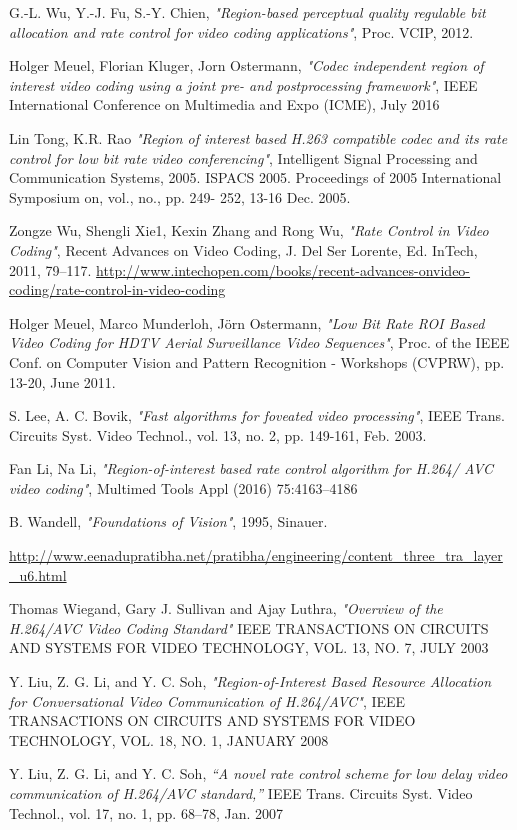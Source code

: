 \documentclass[11pt]{article} %
\begin{document}
\begin{thebibliography}{9}
G.-L. Wu, Y.-J. Fu, S.-Y. Chien, \textit{"Region-based perceptual quality regulable bit allocation and rate control for video coding applications"},
Proc. VCIP, 2012.

Holger Meuel, Florian Kluger, Jorn Ostermann, \textit{"Codec independent region of interest video coding using a joint pre- and postprocessing framework"}, 
IEEE International Conference on Multimedia and Expo (ICME), July 2016

Lin Tong, K.R. Rao \textit{"Region of interest based H.263 compatible codec and its rate control for low bit rate video conferencing"}, 
Intelligent Signal Processing and Communication Systems, 2005. ISPACS 2005. Proceedings of 2005 International Symposium on, vol., no., pp. 249- 252, 13-16 Dec. 2005.

Zongze Wu, Shengli Xie1, Kexin Zhang and Rong Wu, \textit{"Rate Control in Video Coding"},
Recent Advances on Video Coding, J. Del Ser Lorente, Ed. InTech,
2011, 79–117. \url{http://www.intechopen.com/books/recent-advances-onvideo-coding/rate-control-in-video-coding}

Holger Meuel, Marco Munderloh, Jörn Ostermann, \textit{"Low Bit Rate ROI Based Video Coding for HDTV Aerial Surveillance Video Sequences"}, 
Proc. of the IEEE Conf. on Computer Vision and Pattern Recognition - Workshops (CVPRW), pp. 13-20, June 2011.

S. Lee, A. C. Bovik, \textit{"Fast algorithms for foveated video processing"},
IEEE Trans. Circuits Syst. Video Technol., vol. 13, no. 2, pp. 149-161, Feb. 2003.

Fan Li, Na Li, \textit{"Region-of-interest based rate control algorithm for H.264/
AVC video coding"},
Multimed Tools Appl (2016) 75:4163–4186
 
B. Wandell, \textit{"Foundations of Vision"}, 1995, Sinauer.

\url{http://www.eenadupratibha.net/pratibha/engineering/content_three_tra_layer_u6.html}

Thomas Wiegand, Gary J. Sullivan and Ajay Luthra, \textit{"Overview of the H.264/AVC Video Coding Standard"}
IEEE TRANSACTIONS ON CIRCUITS AND SYSTEMS FOR VIDEO TECHNOLOGY, VOL. 13, NO. 7, JULY 2003

Y. Liu, Z. G. Li, and Y. C. Soh, \textit{"Region-of-Interest Based Resource Allocation for Conversational Video Communication of H.264/AVC"},
IEEE TRANSACTIONS ON CIRCUITS AND SYSTEMS FOR VIDEO TECHNOLOGY, VOL. 18, NO. 1, JANUARY 2008

Y. Liu, Z. G. Li, and Y. C. Soh, \textit{“A novel rate control scheme for low
delay video communication of H.264/AVC standard,”}
IEEE Trans. Circuits Syst. Video Technol., vol. 17, no. 1, pp. 68–78, Jan. 2007
\end{thebibliography}
\end{document}
